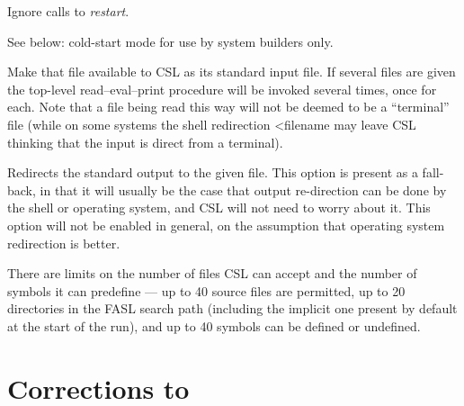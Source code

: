 \vspace{2mm}
\vspace{1mm}

\hspace*{.25in}\parbox{4.5in}{
Ignore calls to {\em restart}.
}

\vspace{2mm} 
\vspace{1mm}

\hspace*{.25in}\parbox{4.5in}{
See below: cold-start mode for use by system builders only.}

\vspace{2mm}
\vspace{1mm}

\hspace*{.25in}\parbox{4.5in}{
Make that file available to CSL as its standard input file.
If several files are given the top-level read--eval--print
procedure will be invoked several times, once for each.  Note
that a file being read this way will not be deemed to be a
``terminal'' file (while on some systems the shell redirection
<filename may leave CSL thinking that the input is direct from
a terminal).}

\vspace{2mm} 
\vspace{1mm}

\hspace*{.25in}\parbox{4.5in}{
Redirects the standard output to the given file.  This option
is present as a fall-back, in that it will usually be the case
that output re-direction can be done by the shell or operating
system, and CSL will not need to worry about it.  This option
will not be enabled in general, on the assumption that
operating system redirection is better.}

\vspace{4mm}

There are limits on the number of files CSL can accept and the number
of symbols it can predefine --- up to 40 source files are permitted, up
to 20 directories in the FASL search path (including the implicit one
present by default at the start of the run), and up to 40 symbols can
be defined or undefined.

\section{Corrections to \REDUCE\ }
\label{update}

